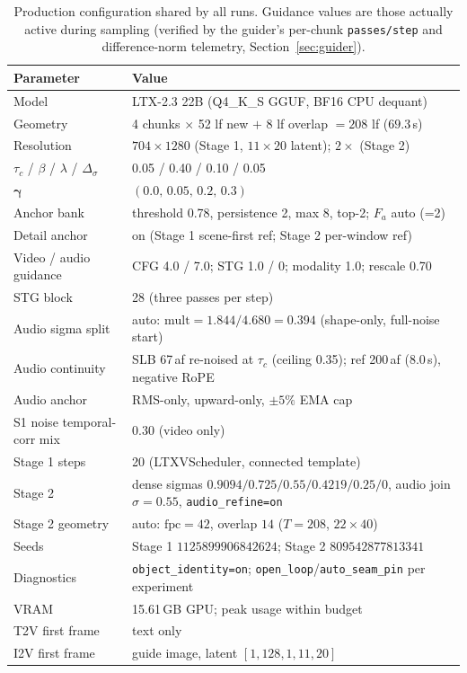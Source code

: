 \documentclass[12pt]{article}
\begin{document}
\begin{table}[H]
\centering
\caption{Production configuration shared by all runs.  Guidance values are
those actually active during sampling (verified by the guider's per-chunk
\texttt{passes/step} and difference-norm telemetry, Section~\ref{sec:guider}).}
\label{tab:config}
\begin{tabular}{ll}
\toprule
Parameter & Value \\
\midrule
Model & LTX-2.3 22B (Q4\_K\_S GGUF, BF16 CPU dequant) \\
Geometry & 4 chunks $\times$ 52 lf new $+$ 8 lf overlap $=208$ lf ($69.3$\,s) \\
Resolution & $704\times1280$ (Stage 1, $11\times20$ latent); $2\times$ (Stage 2) \\
$\tau_c$ / $\beta$ / $\lambda$ / $\Delta_\sigma$ & 0.05 / 0.40 / 0.10 / 0.05 \\
$\boldsymbol\gamma$ & $(0.0,\,0.05,\,0.2,\,0.3)$ \\
Anchor bank & threshold 0.78, persistence 2, max 8, top-2; $F_a$ auto (=2) \\
Detail anchor & on (Stage 1 scene-first ref; Stage 2 per-window ref) \\
Video / audio guidance & CFG 4.0 / 7.0; STG 1.0 / 0; modality 1.0; rescale 0.70 \\
STG block & 28 (three passes per step) \\
Audio sigma split & auto: $\text{mult}=1.844/4.680=0.394$ (shape-only, full-noise start) \\
Audio continuity & SLB 67\,af re-noised at $\tau_c$ (ceiling 0.35); ref 200\,af (8.0\,s), negative RoPE \\
Audio anchor & RMS-only, upward-only, $\pm5\%$ EMA cap \\
S1 noise temporal-corr mix & 0.30 (video only) \\
Stage 1 steps & 20 (LTXVScheduler, connected template) \\
Stage 2 & dense sigmas $0.9094/0.725/0.55/0.4219/0.25/0$, audio join $\sigma=0.55$, \texttt{audio\_refine=on} \\
Stage 2 geometry & auto: $\text{fpc}=42$, overlap $14$ ($T=208$, $22\times40$) \\
Seeds & Stage 1 $1125899906842624$; Stage 2 $809542877813341$ \\
Diagnostics & \texttt{object\_identity=on}; \texttt{open\_loop}/\texttt{auto\_seam\_pin} per experiment \\
VRAM & 15.61\,GB GPU; peak usage within budget \\
\midrule
T2V first frame & text only \\
I2V first frame & guide image, latent $[1,128,1,11,20]$ \\
\bottomrule
\end{tabular}
\end{table}
\end{document}
